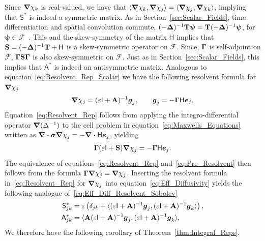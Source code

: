 \documentclass[leqno,onefignum,onetabnum]{siamltex1213}
\newcommand{\secref}[1]{Section~\ref{#1}}
\newcommand{\thmref}[1]{Theorem~\ref{#1}}
\newcommand{\Mb}{\mathbf{M}}
\newcommand{\Tb}{\mathbf{T}}
\newcommand{\Sb}{\mathbf{S}}
\newcommand{\Ab}{\mathbf{A}}
\newcommand{\Fc}{\mathcal{F}}
\newcommand{\Hm}{\mathsf{H}}
\newcommand{\Sm}{\mathsf{S}}
\newcommand{\Am}{\mathsf{A}}
\newcommand{\Ib}{\mathsf{I}}
\newcommand\bsig{\mbox{\boldmath${\sigma}$}}
\newcommand\bDelta{\mbox{\boldmath${\Delta}$}}
\newcommand\bGamma{\mbox{\boldmath${\Gamma}$}}
\newcommand\bnabla{\mbox{\boldmath${\nabla}$}}
\providecommand\bcdot{\boldsymbol{\cdot}}
\newcommand{\vecg}{\boldsymbol{g}}
\newcommand{\vece}{\boldsymbol{e}}
\newcommand{\vecpsi}{\boldsymbol{\psi}}
\begin{document}
Since $\bnabla\chi_k$ is real-valued, we have that
$\langle\bnabla\chi_k,\bnabla\chi_j\rangle=\langle\bnabla\chi_j,\bnabla\chi_k\rangle$, implying that
$\Sm^*$ is indeed a symmetric matrix. As in
\secref{sec:Scalar_Fields}, time differentiation and spatial
convolution commute,
$(-\bDelta)^{-1}\Tb\vecpsi=\Tb(-\bDelta)^{-1}\vecpsi$, for
$\vecpsi\in\Fc$~\cite{Folland:99:RealAnalysis,Stakgold:BVP:2000}. This
and the skew-symmetry of the matrix $\Hm$ implies that
$\Sb=(-\bDelta)^{-1}\Tb+\Hm$ is a skew-symmetric operator on
$\Fc$. Since, $\bGamma$ is self-adjoint on $\Fc$, $\bGamma\Sb\bGamma$
is also skew-symmetric on $\Fc$. Just as in
\secref{sec:Scalar_Fields}, this implies that $\Am^*$ is indeed an
antisymmetric matrix. Analogous to
equation~\eqref{eq:Resolvent_Rep_Scalar} we have the following
resolvent formula for $\bnabla\chi_j$
% 
\begin{align}\label{eq:Resolvent_Rep}
  \bnabla \chi_j=(\varepsilon\Ib+\Ab)^{-1}\vecg_j,
  \qquad
  \vecg_j=-\bGamma\Hm\vece_j.
\end{align}
%
Equation~\eqref{eq:Resolvent_Rep} follows from
applying the integro-differential operator $\bnabla (\Delta^{-1})$ to the
cell problem in equation~\eqref{eq:Maxwells_Equations} written as 
$\bnabla\bcdot\bsig\bnabla\chi_j=-\bnabla\bcdot\Hm\vece_j$, yielding  
%
\begin{align}\label{eq:Pre_Resolvent}
  \bGamma(\varepsilon\Ib+\Sb)\bnabla \chi_j=-\bGamma\Hm\vece_j.
\end{align}
%
The equivalence of equations~\eqref{eq:Resolvent_Rep}
and~\eqref{eq:Pre_Resolvent} then follows from the formula
$\bGamma\bnabla\chi_j=\bnabla\chi_j$. Inserting the resolvent formula
in~\eqref{eq:Resolvent_Rep} for $\bnabla\chi_j$ into
equation~\eqref{eq:Eff_Diffusivity} yields the following analogue
of~\eqref{eq:Eff_Diff_Resolvent_Sobolev} 
%
\begin{align}\label{eq:Eff_Diff_Resolvent}
 \Sm^*_{jk}&=\varepsilon\left(\delta_{jk}+\langle(\varepsilon\Ib+\Ab)^{-1}\vecg_j,(\varepsilon\Ib+\Ab)^{-1}\vecg_k\rangle\right),
 \\
 \Am^*_{jk}&=\langle\Ab(\varepsilon\Ib+\Ab)^{-1}\vecg_j,(\varepsilon\Ib+\Ab)^{-1}\vecg_k\rangle,
 \notag
\end{align}
%
We therefore have the following corollary of \thmref{thm:Integral_Reps}.
%
\end{document}
